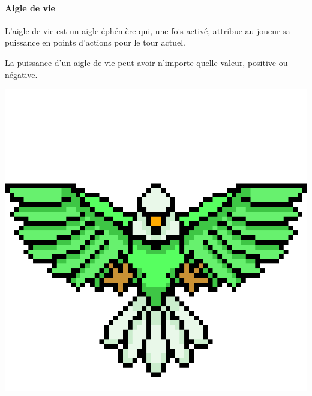 \newpage

\begin{minipage}{.75\textwidth}
    \paragraph{Aigle de vie}
    L'aigle de vie est un aigle éphémère qui, une fois activé, attribue au joueur
    sa puissance en points d'actions pour le tour actuel.
    
    La puissance d'un aigle de vie peut avoir n'importe quelle valeur, positive
    ou négative.
\end{minipage}
\begin{minipage}{.2\textwidth}
    \centering
    \includegraphics[width=.8\textwidth]{img/sprites/aigle_vie.png}
\end{minipage}

